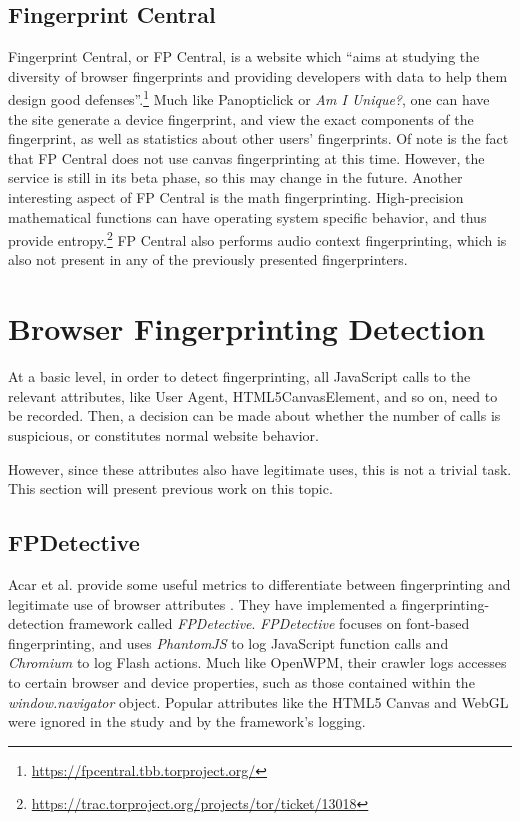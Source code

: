 \documentclass[
    fontsize=12pt,
    headings=small,
    parskip=half,
    bibliography=totoc,
    numbers=noenddot,
    open=any
    ]{scrreprt}
\begin{document}
\subsection{Fingerprint Central}
\label{related_work:fp_central}
Fingerprint Central, or FP Central, is a website which ``aims at studying the diversity
of browser fingerprints and providing developers with data to help them design good defenses''.\footnote{\url{https://fpcentral.tbb.torproject.org/}}
Much like Panopticlick or \textit{Am I Unique?}, one can have the site generate a device fingerprint,
and view the exact components of the fingerprint, as well as statistics about other users' fingerprints.
Of note is the fact that FP Central does not use canvas fingerprinting at this time.
However, the service is still in its beta phase, so this may change in the future.
Another interesting aspect of FP Central is the math fingerprinting.
High-precision mathematical functions can have operating system specific behavior, and thus provide
entropy.\footnote{\url{https://trac.torproject.org/projects/tor/ticket/13018}}
FP Central also performs audio context fingerprinting, which is also not present in any of the previously presented
fingerprinters.


\section{Browser Fingerprinting Detection}
At a basic level, in order to detect fingerprinting, all JavaScript calls to the relevant attributes,
like User Agent, HTML5CanvasElement, and so on, need to be recorded. Then, a decision can be made about whether the number
of calls is suspicious, or constitutes normal website behavior.

However, since these attributes also have legitimate uses, this is not a trivial task.
This section will present previous work on this topic.


\subsection{FPDetective}
\label{related_work:fpdetective}
Acar et al. provide some useful metrics to differentiate between fingerprinting and legitimate use of
browser attributes \cite{DBLP:conf/ccs/AcarJNDGPP13}. They have implemented a fingerprinting-detection
framework called \textit{FPDetective}.
\textit{FPDetective} focuses on font-based fingerprinting, and uses
\textit{PhantomJS} to log JavaScript function calls and \textit{Chromium} to log Flash actions.
Much like OpenWPM, their crawler logs accesses to certain browser and device properties, such as
those contained within the \textit{window.navigator} object.
Popular attributes like the HTML5 Canvas and WebGL were ignored in the study and by the framework's logging.
\end{document}
